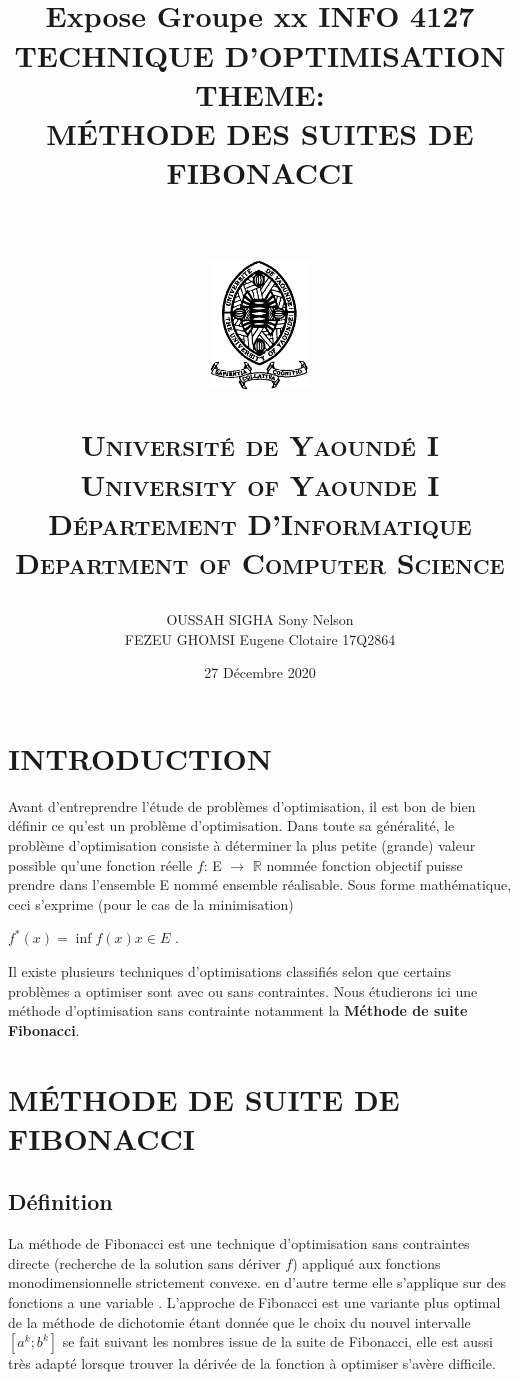 \documentclass[a4paper,14pt]{article}
\title{
    \horrule{0.5pt} \\ [0.4cm]
    \Huge Expose Groupe xx INFO 4127 TECHNIQUE D'OPTIMISATION\\ THEME: \\ MÉTHODE DES SUITES DE FIBONACCI\\
    \horrule{2pt} \\[0.5cm]
\begin{center}
\includegraphics[width=100px]{univyde1}\\[15pt]
\end{center}
    \usefont{OT1}{bch}{b}{n}
    \normalfont \normalsize \textsc{Université de Yaoundé I\\University of Yaounde I} \\ [25pt]
    \normalfont \normalsize \textsc{Département D'Informatique\\Department of Computer Science} \\ [20pt]
 }
\author{
    \normalfont                                 
    OUSSAH SIGHA Sony Nelson \\[5pt]
    FEZEU GHOMSI Eugene Clotaire  17Q2864\\[5pt]    
    \normalsize
}
\date{27 Décembre 2020}
\begin{document}
\maketitle

\pagebreak

\tableofcontents{}

\pagebreak


\section*{INTRODUCTION}

Avant d'entreprendre l'étude de problèmes d'optimisation, il est bon de bien définir ce
qu'est un problème d'optimisation. Dans toute sa généralité, le problème d'optimisation
consiste à déterminer la plus petite (grande) valeur possible qu'une fonction réelle $f$: E $\longrightarrow$ $\mathbb{R}$ nommée fonction objectif puisse prendre dans l'ensemble E nommé ensemble réalisable. Sous forme mathématique, ceci s'exprime (pour le cas de la minimisation)

\begin{center}
$ f^{*}(x) = \inf f(x) x \in E $ .
\end{center}

Il existe plusieurs techniques d'optimisations classifiés selon que certains problèmes a optimiser sont avec ou sans contraintes. Nous étudierons ici une méthode d'optimisation sans contrainte notamment la \textbf{Méthode de suite Fibonacci}.\\

\section{MÉTHODE DE SUITE DE FIBONACCI}

\subsection{Définition}

La méthode de Fibonacci est une technique d'optimisation sans contraintes directe (recherche de la solution sans dériver $f$) appliqué aux fonctions monodimensionnelle strictement convexe. en d'autre terme elle s'applique sur des fonctions a une variable  . L'approche de Fibonacci est une variante plus optimal de la méthode de dichotomie étant donnée que le choix du nouvel intervalle $[a^{k}; b^{k}]$ se fait suivant les nombres issue de la suite de Fibonacci, elle est aussi très adapté lorsque trouver la dérivée de la fonction à optimiser s'avère difficile.
\end{document}
